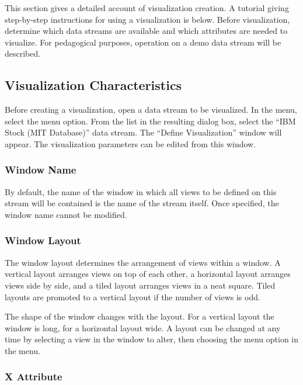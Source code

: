 This section gives a detailed account of visualization creation. A tutorial
giving step-by-step instructions for using a visualization is below. Before
visualization, determine which data streams are available and which attributes
are needed to visualize. For pedagogical purposes, operation on a demo data
stream will be described.


\subsection{Visualization Characteristics}

Before creating a visualization, open a data stream to be visualized. In the
 menu, select the  menu option. From the list in the
resulting dialog box, select the ``IBM Stock (MIT Database)'' data stream. The
``Define Visualization'' window will appear. The visualization parameters can be
edited from this window.

\subsubsection{Window Name}

By default, the name of the window in which all views to be defined on this
stream will be contained is the name of the stream itself. Once specified, the
window name cannot be modified.

\subsubsection{Window Layout}

The window layout determines the arrangement of views within a window. A
vertical layout arranges views on top of each other, a horizontal layout
arranges views side by side, and a tiled layout arranges views in a neat
square. Tiled layouts are promoted to a vertical layout if the number
of views is odd.

The shape of the window changes with the layout. For a vertical layout the
window is long, for a horizontal layout wide. A layout can be changed at any
time by selecting a view in the window to alter, then choosing the 
menu option in the  menu.

\subsubsection{X Attribute}

